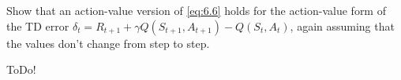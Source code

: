 
\begin{exercise}[Exercise 6.8]

Show that an action-value version of \eqref{eq:6.6} holds for the action-value form of the TD error $\delta_t = R_{t+1} + \gamma Q(S_{t+1}, A_{t+1}) - Q(S_t, A_t)$, again assuming that the values don't change from step to step.

\end{exercise}


\begin{solution}

ToDo!

\end{solution}

